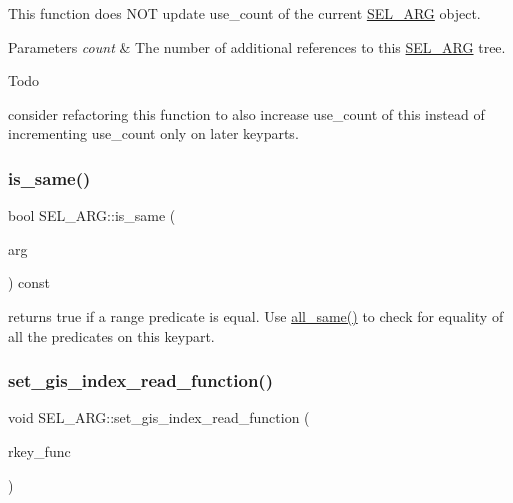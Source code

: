 This function does N\+OT update use\+\_\+count of the current \mbox{\hyperlink{classSEL__ARG}{S\+E\+L\+\_\+\+A\+RG}} object.


\begin{DoxyParams}{Parameters}
{\em count} & The number of additional references to this \mbox{\hyperlink{classSEL__ARG}{S\+E\+L\+\_\+\+A\+RG}} tree.\\
\hline
\end{DoxyParams}
\begin{DoxyRefDesc}{Todo}
\item[\mbox{\hyperlink{todo__todo000056}{Todo}}]consider refactoring this function to also increase use\+\_\+count of \textquotesingle{}this\textquotesingle{} instead of incrementing use\+\_\+count only on later keyparts. \end{DoxyRefDesc}
\mbox{\label{classSEL__ARG_a23667e38c8cec7a3f4916a1d63c93638}} 
\subsubsection{\texorpdfstring{is\+\_\+same()}{is\_same()}}
{\footnotesize\ttfamily bool S\+E\+L\+\_\+\+A\+R\+G\+::is\+\_\+same (\begin{DoxyParamCaption}\item[{const \mbox{\hyperlink{classSEL__ARG}{S\+E\+L\+\_\+\+A\+RG}} $\ast$}]{arg }\end{DoxyParamCaption}) const\hspace{0.3cm}{\ttfamily [inline]}}

returns true if a range predicate is equal. Use \mbox{\hyperlink{classSEL__ARG_aef101e0a11dd01253175b280d12e2964}{all\+\_\+same()}} to check for equality of all the predicates on this keypart. \mbox{\label{classSEL__ARG_a20d3bbdb965d2180179ee5028d544f0c}} 
\subsubsection{\texorpdfstring{set\+\_\+gis\+\_\+index\+\_\+read\+\_\+function()}{set\_gis\_index\_read\_function()}}
{\footnotesize\ttfamily void S\+E\+L\+\_\+\+A\+R\+G\+::set\+\_\+gis\+\_\+index\+\_\+read\+\_\+function (\begin{DoxyParamCaption}\item[{const enum ha\+\_\+rkey\+\_\+function}]{rkey\+\_\+func }\end{DoxyParamCaption})\hspace{0.3cm}{\ttfamily [inline]}}

